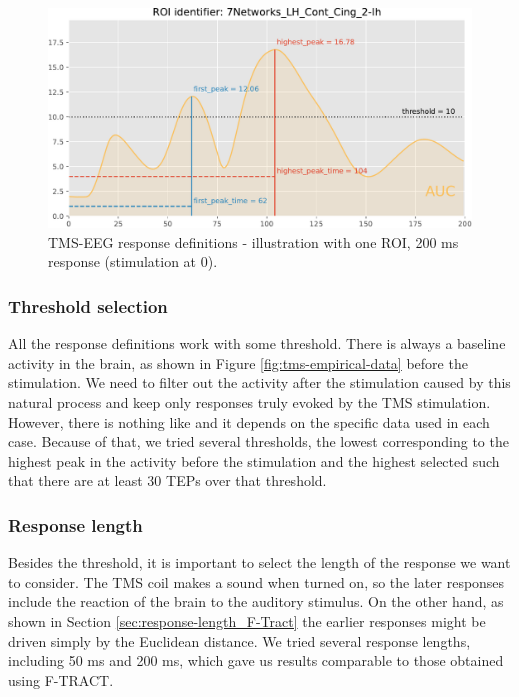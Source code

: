 \begin{figure}
    \centering
    \includegraphics[width=\textwidth]{images/nootebook_generated/pytepfit_results/simulated/200/not_over_threshold_nan/7Networks_LH_Cont_Cing_2-lh_response_def.pdf}
    \caption[TMS-EEG response definitions -- illustration]{TMS-EEG response definitions - illustration with one ROI, 200 ms response (stimulation at 0).}
    \label{fig:tms-respondse-definition}
\end{figure}

\subsubsection{Threshold selection}

All the response definitions work with some threshold. There is always a baseline activity in the brain, as shown in Figure \ref{fig:tms-empirical-data} before the stimulation. We need to filter out the activity after the stimulation caused by this natural process and keep only responses truly evoked by the TMS stimulation. However, there is nothing like  and it depends on the specific data used in each case. Because of that, we tried several thresholds, the lowest corresponding to the highest peak in the activity before the stimulation and the highest selected such that there are at least 30 TEPs over that threshold.

\subsubsection{Response length}

Besides the threshold, it is important to select the length of the response we want to consider. The TMS coil makes a sound when turned on, so the later responses include the reaction of the brain to the auditory stimulus. On the other hand, as shown in Section \ref{sec:response-length_F-Tract} the earlier responses might be driven simply by the Euclidean distance. We tried several response lengths, including 50 ms and 200 ms, which gave us results comparable to those obtained using F-TRACT.

